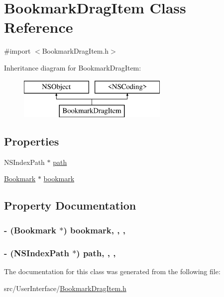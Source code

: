 \hypertarget{interface_bookmark_drag_item}{\section{Bookmark\-Drag\-Item Class Reference}
\label{interface_bookmark_drag_item}
}


{\ttfamily \#import $<$Bookmark\-Drag\-Item.\-h$>$}

Inheritance diagram for Bookmark\-Drag\-Item\-:\begin{figure}[H]
\begin{center}
\leavevmode
\includegraphics[height=2.000000cm]{interface_bookmark_drag_item}
\end{center}
\end{figure}
\subsection*{Properties}
\begin{DoxyCompactItemize}
\item 
N\-S\-Index\-Path $\ast$ \hyperlink{interface_bookmark_drag_item_ac1a7ba8918b4eaabc1f791c68d0c9539}{path}
\item 
\hyperlink{interface_bookmark}{Bookmark} $\ast$ \hyperlink{interface_bookmark_drag_item_abbf58815763455facef473dfaf1f5bd1}{bookmark}
\end{DoxyCompactItemize}


\subsection{Property Documentation}
\hypertarget{interface_bookmark_drag_item_abbf58815763455facef473dfaf1f5bd1}{
\subsubsection[{bookmark}]{\setlength{\rightskip}{0pt plus 5cm}-\/ ({\bf Bookmark} $\ast$) bookmark\hspace{0.3cm}{\ttfamily [read]}, {\ttfamily [write]}, {\ttfamily [atomic]}, {\ttfamily [retain]}}}\label{interface_bookmark_drag_item_abbf58815763455facef473dfaf1f5bd1}
\hypertarget{interface_bookmark_drag_item_ac1a7ba8918b4eaabc1f791c68d0c9539}{
\subsubsection[{path}]{\setlength{\rightskip}{0pt plus 5cm}-\/ (N\-S\-Index\-Path $\ast$) path\hspace{0.3cm}{\ttfamily [read]}, {\ttfamily [write]}, {\ttfamily [atomic]}, {\ttfamily [retain]}}}\label{interface_bookmark_drag_item_ac1a7ba8918b4eaabc1f791c68d0c9539}


The documentation for this class was generated from the following file\-:\begin{DoxyCompactItemize}
\item 
src/\-User\-Interface/\hyperlink{_bookmark_drag_item_8h}{Bookmark\-Drag\-Item.\-h}\end{DoxyCompactItemize}
